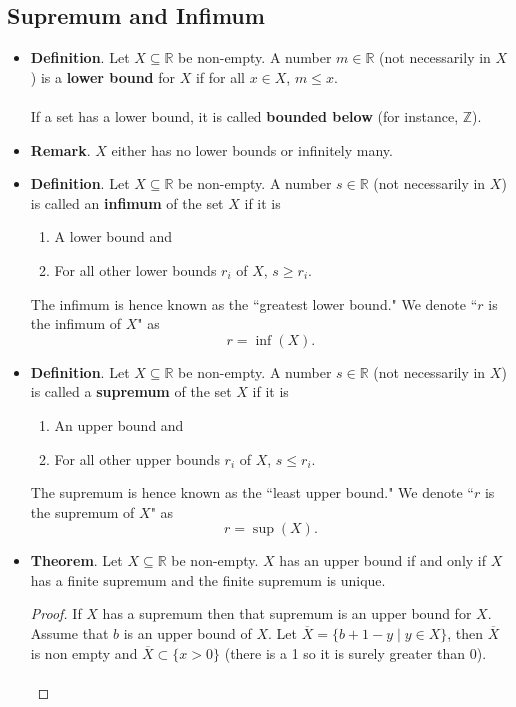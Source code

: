 \documentclass{article}
\newcommand{\Z}{\mathbb{Z}}
\newcommand{\R}{\mathbb{R}}
\newcommand{\set}[2]{\{ #1 \mid #2 \}}
\newcommand{\?}{\stackrel{?}{=}}
\begin{document}
\subsection{Supremum and Infimum}

\begin{itemize}
    \item \textbf{Definition}. Let $X \subseteq \R$ be non-empty. A number $m \in \R$ (not necessarily in $X$) is a \textbf{lower bound} for $X$ if for all $x \in X$, $m \leq x$. \\\\
    If a set has a lower bound, it is called \textbf{bounded below} (for instance, $\Z$).
    \item \textbf{Remark}. $X$ either has no lower bounds or infinitely many.
    \item \textbf{Definition}. Let $X \subseteq \R$ be non-empty. A number $s \in \R$ (not necessarily in $X$) is called an \textbf{infimum} of the set $X$ if it is
    \begin{enumerate}[label=(\arabic*)]
        \item A lower bound and
        \item For all other lower bounds $r_i$ of $X$, $s \geq r_i$.
    \end{enumerate}
    The infimum is hence known as the ``greatest lower bound." We denote ``$r$ is the infimum of $X$" as
    $$r = \inf(X).$$
    \item \textbf{Definition}. Let $X \subseteq \R$ be non-empty. A number $s \in \R$ (not necessarily in $X$) is called a \textbf{supremum} of the set $X$ if it is
    \begin{enumerate}[label=(\arabic*)]
        \item An upper bound and
        \item For all other upper bounds $r_i$ of $X$, $s \leq r_i$.
    \end{enumerate}
    The supremum is hence known as the ``least upper bound." We denote ``$r$ is the supremum of $X$" as
    $$r = \sup(X).$$
    \item \textbf{Theorem}. Let $X \subseteq \R$ be non-empty. $X$ has an upper bound if and only if $X$ has a finite supremum and the finite supremum is unique.
    \begin{proof}
        If $X$ has a supremum then that supremum is an upper bound for $X$. Assume that $b$ is an upper bound of $X$. Let $\overline{X} = \set{b + 1 - y}{y \in X}$, then $\overline{X}$ is non empty and $\overline{X} \subset \{x > 0\}$ (there is a 1 so it is surely greater than 0). \\\\

\end{proof}
\end{itemize}
\end{document}

